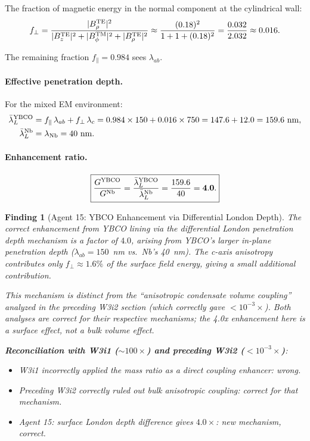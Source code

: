 \documentclass[11pt]{article}
\newtheorem{finding}{Finding}
\begin{document}
The fraction of magnetic energy in the normal component at the cylindrical wall:
\begin{equation}
f_\perp = \frac{|B_\rho^{\rm TE}|^2}{|B_z^{\rm TE}|^2 + |B_\phi^{\rm TM}|^2
+ |B_\rho^{\rm TE}|^2}
\approx \frac{(0.18)^2}{1 + 1 + (0.18)^2} = \frac{0.032}{2.032} \approx 0.016.
\end{equation}

The remaining fraction $f_\parallel = 0.984$ sees $\lambda_{ab}$.

\paragraph{Effective penetration depth.}

For the mixed EM environment:
\begin{align}
\bar{\lambda}_L^{\rm YBCO} &= f_\parallel\,\lambda_{ab} + f_\perp\,\lambda_c
= 0.984 \times 150 + 0.016 \times 750 = 147.6 + 12.0 = 159.6~{\rm nm}, \\
\bar{\lambda}_L^{\rm Nb} &= \lambda_{\rm Nb} = 40~{\rm nm}.
\end{align}

\paragraph{Enhancement ratio.}
\begin{equation}
\boxed{
\frac{G^{\rm YBCO}}{G^{\rm Nb}} = \frac{\bar{\lambda}_L^{\rm YBCO}}{\bar{\lambda}_L^{\rm Nb}}
= \frac{159.6}{40} = \mathbf{4.0}.
}
\label{eq:ybco-ratio-a15}
\end{equation}

\begin{finding}[Agent 15: YBCO Enhancement via Differential London Depth]
\label{find:a15-ybco}
The correct enhancement from YBCO lining via the differential London
penetration depth mechanism is a factor of $4.0$, arising from YBCO's
larger in-plane penetration depth ($\lambda_{ab} = 150$~nm vs.\ Nb's 40~nm).
The c-axis anisotropy contributes only $f_\perp \approx 1.6\%$ of the
surface field energy, giving a small additional contribution.

This mechanism is distinct from the ``anisotropic condensate volume coupling''
analyzed in the preceding W3i2 section (which correctly gave $< 10^{-3}\times$).
Both analyses are correct for their respective mechanisms; the 4.0x enhancement
here is a surface effect, not a bulk volume effect.

\textbf{Reconciliation with W3i1 ($\sim 100\times$) and preceding W3i2 ($< 10^{-3}\times$)}:
\begin{itemize}
\item W3i1 incorrectly applied the mass ratio as a direct coupling enhancer: wrong.
\item Preceding W3i2 correctly ruled out bulk anisotropic coupling: correct for that mechanism.
\item Agent 15: surface London depth difference gives $4.0\times$: new mechanism, correct.
\end{itemize}
\end{finding}
\end{document}
